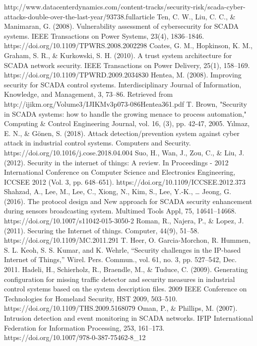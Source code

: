 \documentclass[letterpaper, 10 pt, conference]{ieeeconf}  %
\begin{document}
\begin{thebibliography}{99}
http://www.datacenterdynamics.com/content-tracks/security-risk/scada-cyber-attacks-double-over-the-last-year/93738.fullarticle
Ten, C. W., Liu, C. C., \& Manimaran, G. (2008). Vulnerability assessment of cybersecurity for SCADA systems. IEEE Transactions on Power Systems, 23(4), 1836–1846. https://doi.org/10.1109/TPWRS.2008.2002298
Coates, G. M., Hopkinson, K. M., Graham, S. R., \& Kurkowski, S. H. (2010). A trust system architecture for SCADA network security. IEEE Transactions on Power Delivery, 25(1), 158–169. https://doi.org/10.1109/TPWRD.2009.2034830
Hentea, M. (2008). Improving security for SCADA control systems. Interdisciplinary Journal of Information, Knowledge, and Management, 3, 73–86. Retrieved from http://ijikm.org/Volume3/IJIKMv3p073-086Hentea361.pdf
T. Brown, "Security in SCADA systems: how to handle the growing menace to process automation," Computing \& Control Engineering Journal, vol. 16, (3), pp. 42-47, 2005.
Yılmaz, E. N., \& Gönen, S. (2018). Attack detection/prevention system against cyber attack in industrial control systems. Computers and Security. https://doi.org/10.1016/j.cose.2018.04.004
Suo, H., Wan, J., Zou, C., \& Liu, J. (2012). Security in the internet of things: A review. In Proceedings - 2012 International Conference on Computer Science and Electronics Engineering, ICCSEE 2012 (Vol. 3, pp. 648–651). https://doi.org/10.1109/ICCSEE.2012.373
Shahzad, A., Lee, M., Lee, C., Xiong, N., Kim, S., Lee, Y.-K., … Jeong, G. (2016). The protocol design and New approach for SCADA security enhancement during sensors broadcasting system. Multimed Tools Appl, 75, 14641–14668. https://doi.org/10.1007/s11042-015-3050-2
Roman, R., Najera, P., \& Lopez, J. (2011). Securing the Internet of things. Computer, 44(9), 51–58. https://doi.org/10.1109/MC.2011.291
T. Heer, O. Garcia-Morchon, R. Hummen, S. L. Keoh, S. S. Kumar, and K. Wehrle, “Security challenges in the IP-based Internet of Things,” Wirel. Pers. Commun., vol. 61, no. 3, pp. 527–542, Dec. 2011.
Hadeli, H., Schierholz, R., Braendle, M., \& Tuduce, C. (2009). Generating configuration for missing traffic detector and security measures in industrial control systems based on the system description files. 2009 IEEE Conference on Technologies for Homeland Security, HST 2009, 503–510. https://doi.org/10.1109/THS.2009.5168079
Oman, P., \& Phillips, M. (2007). Intrusion detection and event monitoring in SCADA networks. IFIP International Federation for Information Processing, 253, 161–173. https://doi.org/10.1007/978-0-387-75462-8\_12

\end{thebibliography}
\end{document}
